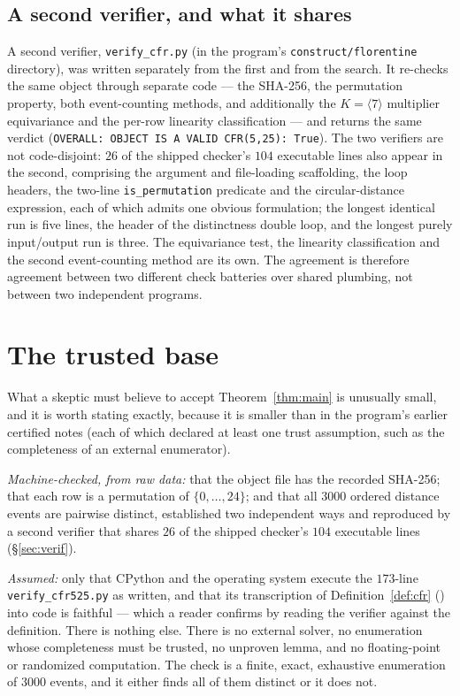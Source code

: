 \documentclass[11pt]{amsart}
\theoremstyle{plain}
\theoremstyle{definition}
\theoremstyle{remark}
\begin{document}
\subsection*{A second verifier, and what it shares}
A second verifier, \texttt{verify\_cfr.py} (in the program's
\texttt{construct/florentine} directory), was written separately from the
first and from the search. It re-checks the same object through separate code
--- the SHA-256, the permutation property, both event-counting methods, and
additionally the $K=\langle 7\rangle$ multiplier equivariance and the per-row
linearity classification --- and returns the same verdict
(\texttt{OVERALL: OBJECT IS A VALID CFR(5,25): True}). The two verifiers are
not code-disjoint: $26$ of the shipped checker's $104$ executable lines also
appear in the second, comprising the argument and file-loading scaffolding, the
loop headers, the two-line \texttt{is\_permutation} predicate and the
circular-distance expression, each of which admits one obvious formulation; the
longest identical run is five lines, the header of the distinctness double loop,
and the longest purely input/output run is three. The equivariance
test, the linearity classification and the second event-counting method are its
own. The agreement is therefore agreement between two different check batteries
over shared plumbing, not between two independent programs.

\section{The trusted base}\label{sec:tcb}

What a skeptic must believe to accept Theorem~\ref{thm:main} is unusually
small, and it is worth stating exactly, because it is smaller than in the
program's earlier certified notes (each of which declared at least one trust
assumption, such as the completeness of an external enumerator).

\emph{Machine-checked, from raw data:} that the object file has the recorded
SHA-256; that each row is a permutation of $\{0,\dots,24\}$; and that all
$3000$ ordered distance events are pairwise distinct, established two
independent ways and reproduced by a second verifier that shares $26$ of the
shipped checker's $104$ executable lines (\S\ref{sec:verif}).

\emph{Assumed:} only that CPython and the operating system execute the
$173$-line \texttt{verify\_cfr525.py} as written, and that its transcription of
Definition~\ref{def:cfr} (\cite[Def.\ 62.1/62.26]{HCD}) into code is faithful
--- which a reader confirms by reading the verifier against the definition.
There is nothing else. There is no external solver, no enumeration whose
completeness must be trusted, no unproven lemma, and no floating-point or
randomized computation. The check is a finite, exact, exhaustive enumeration
of $3000$ events, and it either finds all of them distinct or it does not.
\end{document}
